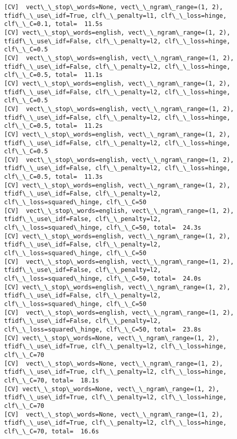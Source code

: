 \documentclass[11pt]{article}
\begin{document}
    \begin{Verbatim}[commandchars=\\\{\}]
[CV]  vect\_\_stop\_words=None, vect\_\_ngram\_range=(1, 2), tfidf\_\_use\_idf=True, clf\_\_penalty=l1, clf\_\_loss=hinge, clf\_\_C=0.1, total=  11.5s
[CV] vect\_\_stop\_words=english, vect\_\_ngram\_range=(1, 2), tfidf\_\_use\_idf=False, clf\_\_penalty=l2, clf\_\_loss=hinge, clf\_\_C=0.5 
[CV]  vect\_\_stop\_words=english, vect\_\_ngram\_range=(1, 2), tfidf\_\_use\_idf=False, clf\_\_penalty=l2, clf\_\_loss=hinge, clf\_\_C=0.5, total=  11.1s
[CV] vect\_\_stop\_words=english, vect\_\_ngram\_range=(1, 2), tfidf\_\_use\_idf=False, clf\_\_penalty=l2, clf\_\_loss=hinge, clf\_\_C=0.5 
[CV]  vect\_\_stop\_words=english, vect\_\_ngram\_range=(1, 2), tfidf\_\_use\_idf=False, clf\_\_penalty=l2, clf\_\_loss=hinge, clf\_\_C=0.5, total=  11.2s
[CV] vect\_\_stop\_words=english, vect\_\_ngram\_range=(1, 2), tfidf\_\_use\_idf=False, clf\_\_penalty=l2, clf\_\_loss=hinge, clf\_\_C=0.5 
[CV]  vect\_\_stop\_words=english, vect\_\_ngram\_range=(1, 2), tfidf\_\_use\_idf=False, clf\_\_penalty=l2, clf\_\_loss=hinge, clf\_\_C=0.5, total=  11.3s
[CV] vect\_\_stop\_words=english, vect\_\_ngram\_range=(1, 2), tfidf\_\_use\_idf=False, clf\_\_penalty=l2, clf\_\_loss=squared\_hinge, clf\_\_C=50 
[CV]  vect\_\_stop\_words=english, vect\_\_ngram\_range=(1, 2), tfidf\_\_use\_idf=False, clf\_\_penalty=l2, clf\_\_loss=squared\_hinge, clf\_\_C=50, total=  24.3s
[CV] vect\_\_stop\_words=english, vect\_\_ngram\_range=(1, 2), tfidf\_\_use\_idf=False, clf\_\_penalty=l2, clf\_\_loss=squared\_hinge, clf\_\_C=50 
[CV]  vect\_\_stop\_words=english, vect\_\_ngram\_range=(1, 2), tfidf\_\_use\_idf=False, clf\_\_penalty=l2, clf\_\_loss=squared\_hinge, clf\_\_C=50, total=  24.0s
[CV] vect\_\_stop\_words=english, vect\_\_ngram\_range=(1, 2), tfidf\_\_use\_idf=False, clf\_\_penalty=l2, clf\_\_loss=squared\_hinge, clf\_\_C=50 
[CV]  vect\_\_stop\_words=english, vect\_\_ngram\_range=(1, 2), tfidf\_\_use\_idf=False, clf\_\_penalty=l2, clf\_\_loss=squared\_hinge, clf\_\_C=50, total=  23.8s
[CV] vect\_\_stop\_words=None, vect\_\_ngram\_range=(1, 2), tfidf\_\_use\_idf=True, clf\_\_penalty=l2, clf\_\_loss=hinge, clf\_\_C=70 
[CV]  vect\_\_stop\_words=None, vect\_\_ngram\_range=(1, 2), tfidf\_\_use\_idf=True, clf\_\_penalty=l2, clf\_\_loss=hinge, clf\_\_C=70, total=  18.1s
[CV] vect\_\_stop\_words=None, vect\_\_ngram\_range=(1, 2), tfidf\_\_use\_idf=True, clf\_\_penalty=l2, clf\_\_loss=hinge, clf\_\_C=70 
[CV]  vect\_\_stop\_words=None, vect\_\_ngram\_range=(1, 2), tfidf\_\_use\_idf=True, clf\_\_penalty=l2, clf\_\_loss=hinge, clf\_\_C=70, total=  16.6s

\end{Verbatim}
\end{document}
